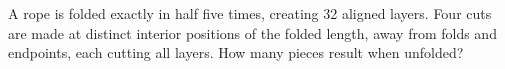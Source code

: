 A rope is folded exactly in half five times, creating 32 aligned layers. Four cuts are made at distinct interior positions of the folded length, away from folds and endpoints, each cutting all layers. How many pieces result when unfolded?

